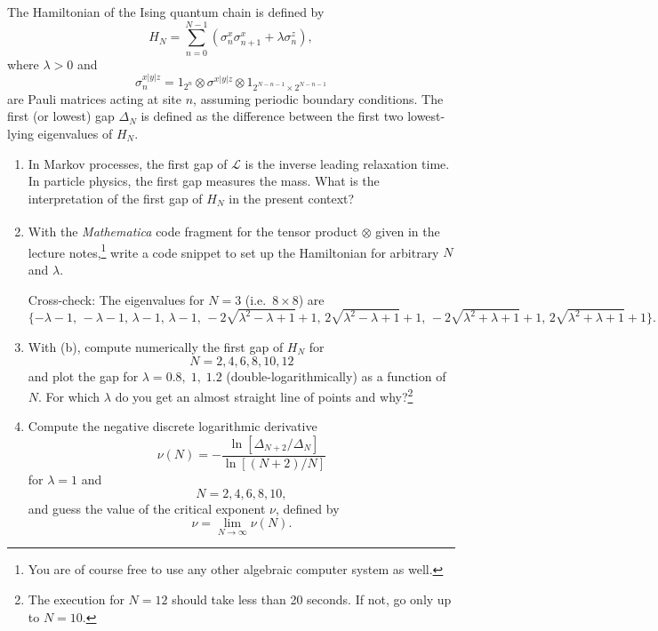 \begin{Problem}

The Hamiltonian of the Ising quantum chain is defined by
\[
H_N=\sum_{n=0}^{N-1}\left(\sigma_n^x\sigma_{n+1}^x+\lambda\sigma_n^z\right),
\]
where $\lambda>0$ and
\[
\sigma_n^{x|y|z}
=
1_{2^n}
\otimes
\sigma^{x|y|z}
\otimes
1_{2^{N-n-1}\times2^{N-n-1}}
\]
are Pauli matrices acting at site $n$, assuming periodic boundary conditions. The first (or lowest) gap $\Delta_N$ is defined as the difference between the first two lowest-lying eigenvalues of $H_N$.

\begin{enumerate}[label=(\alph*)]

\item
In Markov processes, the first gap of $\mathcal{L}$ is the inverse leading relaxation time. In particle physics, the first gap measures the mass. What is the interpretation of the first gap of $H_N$ in the present context?

\item
With the \textit{Mathematica}\textsuperscript{\textregistered} code fragment for the tensor product $\otimes$ given in the lecture notes,\footnote{You are of course free to use any other algebraic computer system as well.}
write a code snippet to set up the Hamiltonian for arbitrary $N$ and $\lambda$.

Cross-check: The eigenvalues for $N=3$ (i.e.\ $8\times8$) are $
\{-\lambda-1,\,
-\lambda-1,\,
\lambda-1,\,
\lambda-1,\,
-2\sqrt{\lambda^2-\lambda+1}+1,\,
2\sqrt{\lambda^2-\lambda+1}+1,\,
-2\sqrt{\lambda^2+\lambda+1}+1,\,
2\sqrt{\lambda^2+\lambda+1}+1
\}.$

\item
With (b), compute numerically the first gap of $H_N$ for
\[
N=2,4,6,8,10,12
\]
and plot the gap for $\lambda=0.8,\;1,\;1.2$ (double-logarithmically) as a function of $N$. For which $\lambda$ do you get an almost straight line of points and why?\footnote{The execution for $N=12$ should take less than 20 seconds. If not, go only up to $N=10$.}

\item
Compute the negative discrete logarithmic derivative
\[
\nu(N)
=
-\frac{\ln\!\left[\Delta_{N+2}/\Delta_N\right]}
{\ln\!\left[(N+2)/N\right]}
\]
for $\lambda=1$ and
\[
N=2,4,6,8,10,
\]
and guess the value of the critical exponent $\nu$, defined by
\[
\nu=\lim_{N\to\infty}\nu(N).
\]

\end{enumerate}

\end{Problem}
